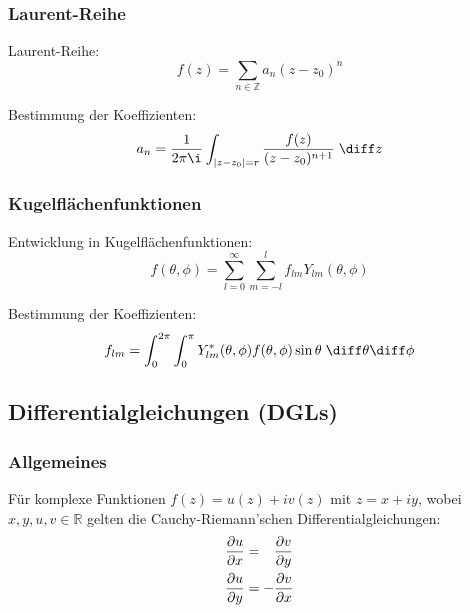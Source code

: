\documentclass[11pt]{article}
\numberwithin{equation}{section}
\begin{document}
      \subsubsection{Laurent-Reihe}
        Laurent-Reihe:
        \begin{equation}
          f(z)=\sum_{n\in\mathbb{Z}} a_n(z-z_0)^n
        \end{equation}

        Bestimmung der Koeffizienten:
        \begin{equation}
          a_n = \frac{1}{2 \pi \i}\int_{\left| z-z_0 \right| = r} \frac{f(z)}{(z-z_0)^{n+1}}\;\diff z
        \end{equation}

      \subsubsection{Kugelflächenfunktionen}
        Entwicklung in Kugelflächenfunktionen:
        \begin{equation}
          f(\theta, \phi) = \sum_{l=0}^{\infty} \sum_{m=-l}^{l} f_{lm} Y_{lm}(\theta,\phi)
        \end{equation}

        Bestimmung der Koeffizienten:
        \begin{equation}
          f_{lm} = \int_0^{2\pi} \int_0^\pi Y_{lm}^{*}(\theta,\phi) f(\theta,\phi) \sin\theta\;\diff\theta\diff\phi
        \end{equation}

    \subsection{Differentialgleichungen (DGLs)}
      \subsubsection{Allgemeines}
        Für komplexe Funktionen $f(z)=u(z)+iv(z)$ mit $z=x+iy$, wobei $x,y,u,v\in\mathbb{R}$ gelten die Cauchy-Riemann'schen Differentialgleichungen:
        \begin{equation}
          \begin{aligned}
            \frac{\partial u}{\partial x} &= \phantom{-}\frac{\partial v}{\partial y} \\
            \frac{\partial u}{\partial y} &= -\frac{\partial v}{\partial x} \\
          \end{aligned}
        \end{equation}
\end{document}
